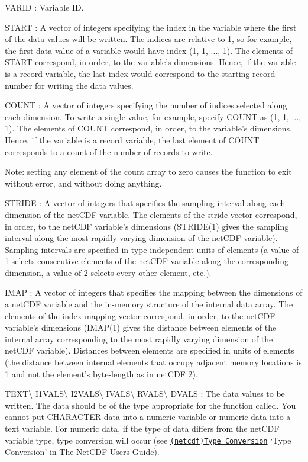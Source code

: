 {\ttfamily V\+A\+R\+ID} \+: Variable ID.

{\ttfamily S\+T\+A\+RT} \+: A vector of integers specifying the index in the variable where the first of the data values will be written. The indices are relative to 1, so for example, the first data value of a variable would have index (1, 1, ..., 1). The elements of S\+T\+A\+RT correspond, in order, to the variable’s dimensions. Hence, if the variable is a record variable, the last index would correspond to the starting record number for writing the data values.

{\ttfamily C\+O\+U\+NT} \+: A vector of integers specifying the number of indices selected along each dimension. To write a single value, for example, specify C\+O\+U\+NT as (1, 1, ..., 1). The elements of C\+O\+U\+NT correspond, in order, to the variable’s dimensions. Hence, if the variable is a record variable, the last element of C\+O\+U\+NT corresponds to a count of the number of records to write.

Note\+: setting any element of the count array to zero causes the function to exit without error, and without doing anything.

{\ttfamily S\+T\+R\+I\+DE} \+: A vector of integers that specifies the sampling interval along each dimension of the net\+C\+DF variable. The elements of the stride vector correspond, in order, to the net\+C\+DF variable’s dimensions (S\+T\+R\+I\+D\+E(1) gives the sampling interval along the most rapidly varying dimension of the net\+C\+DF variable). Sampling intervals are specified in type-\/independent units of elements (a value of 1 selects consecutive elements of the net\+C\+DF variable along the corresponding dimension, a value of 2 selects every other element, etc.).

{\ttfamily I\+M\+AP} \+: A vector of integers that specifies the mapping between the dimensions of a net\+C\+DF variable and the in-\/memory structure of the internal data array. The elements of the index mapping vector correspond, in order, to the net\+C\+DF variable’s dimensions (I\+M\+A\+P(1) gives the distance between elements of the internal array corresponding to the most rapidly varying dimension of the net\+C\+DF variable). Distances between elements are specified in units of elements (the distance between internal elements that occupy adjacent memory locations is 1 and not the element’s byte-\/length as in net\+C\+DF 2).

{\ttfamily T\+E\+XT}\textbackslash{} {\ttfamily I1\+V\+A\+LS}\textbackslash{} {\ttfamily I2\+V\+A\+LS}\textbackslash{} {\ttfamily I\+V\+A\+LS}\textbackslash{} {\ttfamily R\+V\+A\+LS}\textbackslash{} {\ttfamily D\+V\+A\+LS} \+: The data values to be written. The data should be of the type appropriate for the function called. You cannot put C\+H\+A\+R\+A\+C\+T\+ER data into a numeric variable or numeric data into a text variable. For numeric data, if the type of data differs from the net\+C\+DF variable type, type conversion will occur (see \href{netcdf.html#Type-Conversion}{\tt (netcdf)Type Conversion} ‘\+Type Conversion’ in The Net\+C\+DF Users Guide).

